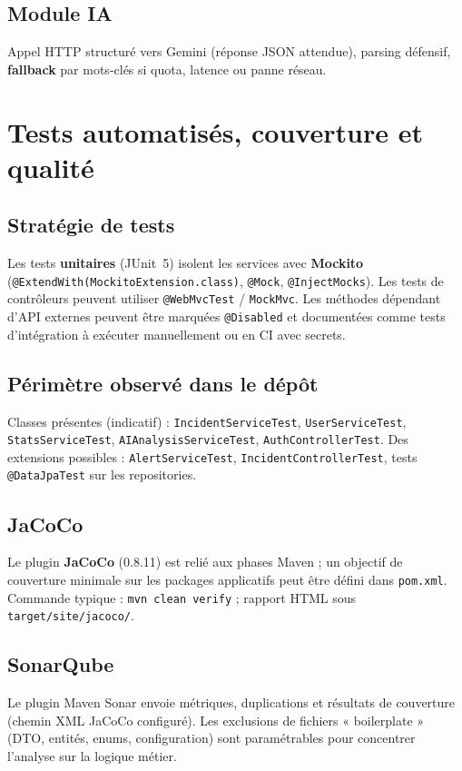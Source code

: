 \documentclass[12pt,a4paper,twoside,openany]{book}
\begin{document}
\section{Module IA}
Appel HTTP structuré vers Gemini (réponse JSON attendue), parsing défensif, \textbf{fallback} par mots-clés si quota, latence ou panne réseau.

\chapter{Tests automatis\'es, couverture et qualit\'e}
\label{chap:tests}
\section{Stratégie de tests}
Les tests \textbf{unitaires} (JUnit~5) isolent les services avec \textbf{Mockito} (\texttt{@ExtendWith(MockitoExtension.class)}, \texttt{@Mock}, \texttt{@InjectMocks}). Les tests de contrôleurs peuvent utiliser \texttt{@WebMvcTest} / \texttt{MockMvc}. Les méthodes dépendant d'API externes peuvent être marquées \texttt{@Disabled} et documentées comme tests d'intégration à exécuter manuellement ou en CI avec secrets.

\section{Périmètre observé dans le dépôt}
Classes présentes (indicatif) : \texttt{IncidentServiceTest}, \texttt{UserServiceTest}, \texttt{StatsServiceTest}, \texttt{AIAnalysisServiceTest}, \texttt{AuthControllerTest}. Des extensions possibles : \texttt{AlertServiceTest}, \texttt{IncidentControllerTest}, tests \texttt{@DataJpaTest} sur les repositories.

\section{JaCoCo}
Le plugin \textbf{JaCoCo} (0.8.11) est relié aux phases Maven ; un objectif de couverture minimale sur les packages applicatifs peut être défini dans \texttt{pom.xml}. Commande typique : \texttt{mvn clean verify} ; rapport HTML sous \texttt{target/site/jacoco/}.

\section{SonarQube}
Le plugin Maven Sonar envoie métriques, duplications et résultats de couverture (chemin XML JaCoCo configuré). Les exclusions de fichiers « boilerplate » (DTO, entités, enums, configuration) sont paramétrables pour concentrer l'analyse sur la logique métier.
\end{document}
